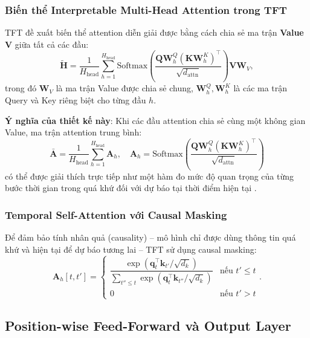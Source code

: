\subsubsection{Biến thể Interpretable Multi-Head Attention trong TFT}

TFT đề xuất biến thể attention diễn giải được bằng cách chia sẻ ma trận \textbf{Value} $\mathbf{V}$ giữa tất cả các đầu:
\begin{equation}
    \tilde{\mathbf{H}} = \frac{1}{H_{\text{head}}} \sum_{h=1}^{H_{\text{head}}} \text{Softmax}\!\left(\frac{\mathbf{Q}\mathbf{W}^Q_h (\mathbf{K}\mathbf{W}^K_h)^\top}{\sqrt{d_{\text{attn}}}}\right) \mathbf{V} \mathbf{W}_V,
    \label{eq:interp_attn_detail}
\end{equation}
trong đó $\mathbf{W}_V$ là ma trận Value được chia sẻ chung, $\mathbf{W}^Q_h, \mathbf{W}^K_h$ là các ma trận Query và Key riêng biệt cho từng đầu $h$.

\textbf{Ý nghĩa của thiết kế này}: Khi các đầu attention chia sẻ cùng một không gian Value, ma trận attention trung bình:
\begin{equation}
    \bar{\mathbf{A}} = \frac{1}{H_{\text{head}}} \sum_{h=1}^{H_{\text{head}}} \mathbf{A}_h, \quad \mathbf{A}_h = \text{Softmax}\!\left(\frac{\mathbf{Q}\mathbf{W}^Q_h (\mathbf{K}\mathbf{W}^K_h)^\top}{\sqrt{d_{\text{attn}}}}\right)
    \label{eq:avg_attention}
\end{equation}
có thể được giải thích trực tiếp như một hàm đo mức độ quan trọng của từng bước thời gian trong quá khứ đối với dự báo tại thời điểm hiện tại \citep{lim2021temporal}.

\subsubsection{Temporal Self-Attention với Causal Masking}

Để đảm bảo tính nhân quả (causality) -- mô hình chỉ được dùng thông tin quá khứ và hiện tại để dự báo tương lai -- TFT sử dụng causal masking:
\begin{equation}
    \mathbf{A}_h[t, t'] = \begin{cases} \dfrac{\exp(\mathbf{q}^\top_t \mathbf{k}_{t'}/\sqrt{d_k})}{\sum_{t'' \le t}\exp(\mathbf{q}^\top_t \mathbf{k}_{t''}/\sqrt{d_k})} & \text{nếu } t' \le t \\ 0 & \text{nếu } t' > t \end{cases}.
    \label{eq:causal_mask}
\end{equation}

\subsection{Position-wise Feed-Forward và Output Layer}
\label{subsec:output}

